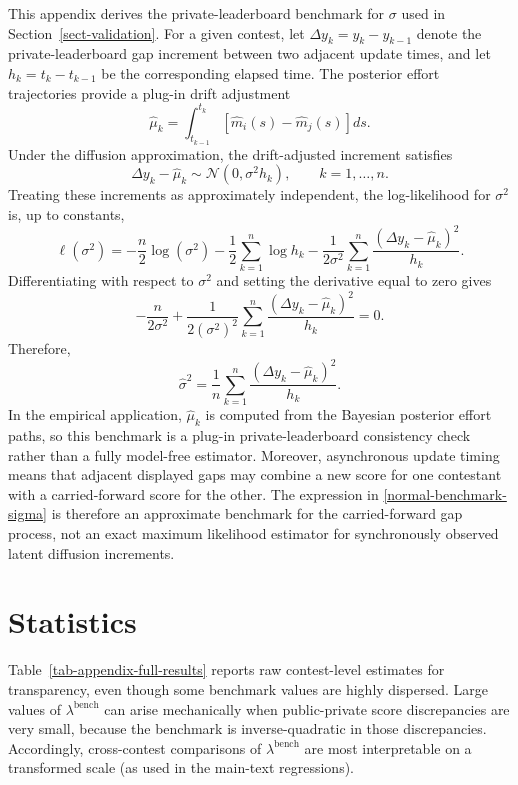 \documentclass[mnsc]{informs3}
\begin{document}
\begin{APPENDICES}
This appendix derives the private-leaderboard benchmark for $\sigma$ used in Section~\ref{sect-validation}.
For a given contest, let $\Delta y_k=y_k-y_{k-1}$ denote the private-leaderboard gap increment between two adjacent update times, and let $h_k=t_k-t_{k-1}$ be the corresponding elapsed time.
The posterior effort trajectories provide a plug-in drift adjustment
\[
\hat\mu_k=\int_{t_{k-1}}^{t_k}\left[\hat m_i(s)-\hat m_j(s)\right]ds.
\]
Under the diffusion approximation, the drift-adjusted increment satisfies
\[
\Delta y_k-\hat\mu_k\sim\mathcal N(0,\sigma^2 h_k),
\qquad k=1,\ldots,n.
\]
Treating these increments as approximately independent, the log-likelihood for $\sigma^2$ is, up to constants,
\[
\ell(\sigma^2)
=
-\frac{n}{2}\log(\sigma^2)
-\frac{1}{2}\sum_{k=1}^n\log h_k
-\frac{1}{2\sigma^2}\sum_{k=1}^n
\frac{(\Delta y_k-\hat\mu_k)^2}{h_k}.
\]
Differentiating with respect to $\sigma^2$ and setting the derivative equal to zero gives
\[
-\frac{n}{2\sigma^2}
+
\frac{1}{2(\sigma^2)^2}
\sum_{k=1}^n
\frac{(\Delta y_k-\hat\mu_k)^2}{h_k}
=0.
\]
Therefore,
\begin{equation}\label{normal-benchmark-sigma}
\hat{\sigma}^2
=
\frac{1}{n}\sum_{k=1}^n
\frac{(\Delta y_k-\hat\mu_k)^2}{h_k}.
\end{equation}
In the empirical application, $\hat\mu_k$ is computed from the Bayesian posterior effort paths, so this benchmark is a plug-in private-leaderboard consistency check rather than a fully model-free estimator. Moreover, asynchronous update timing means that adjacent displayed gaps may combine a new score for one contestant with a carried-forward score for the other. The expression in \eqref{normal-benchmark-sigma} is therefore an approximate benchmark for the carried-forward gap process, not an exact maximum likelihood estimator for synchronously observed latent diffusion increments.








\section{Statistics}\label{appendix-statistics}

Table~\ref{tab-appendix-full-results} reports raw contest-level estimates for transparency, even though some benchmark values are highly dispersed.
Large values of $\lambda^{\text{bench}}$ can arise mechanically when public-private score discrepancies are very small, because the benchmark is inverse-quadratic in those discrepancies.
Accordingly, cross-contest comparisons of $\lambda^{\text{bench}}$ are most interpretable on a transformed scale (as used in the main-text regressions).


\end{APPENDICES}
\end{document}
